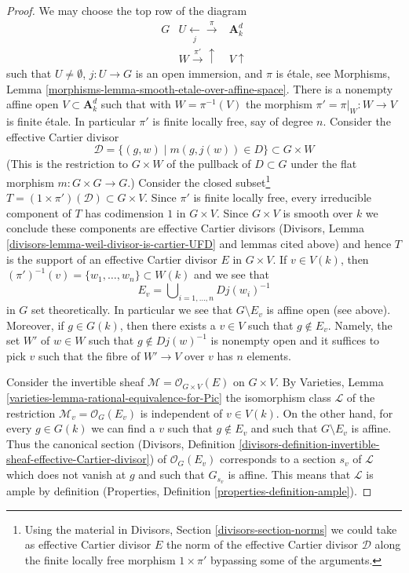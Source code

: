 \begin{proof}
\medskip\noindent
We may choose the top row of the diagram
$$
\begin{array}{ccc}G & U \underset{j}{\longleftarrow}\overset{\pi}{\longrightarrow} & \mathbf{A}^d_k \\  & W \overset{\pi'}{\longrightarrow}\uparrow & V \uparrow\end{array}
$$
such that $U \not = \emptyset$, $j : U \to G$ is an open immersion, and
$\pi$ is \'etale, see
Morphisms, Lemma \ref{morphisms-lemma-smooth-etale-over-affine-space}.
There is a nonempty affine open $V \subset \mathbf{A}^d_k$ such that
with $W = \pi^{-1}(V)$ the morphism $\pi' = \pi|_W : W \to V$ is finite \'etale.
In particular $\pi'$ is finite locally free, say of degree $n$.
Consider the effective Cartier divisor
$$
\mathcal{D} = \{(g, w) \mid m(g, j(w)) \in D\} \subset G \times W
$$
(This is the restriction to $G \times W$ of the pullback of $D \subset G$
under the flat morphism $m : G \times G \to G$.)
Consider the closed subset\footnote{Using the material
in Divisors, Section \ref{divisors-section-norms}
we could take as effective Cartier
divisor $E$ the norm of the effective Cartier divisor $\mathcal{D}$
along the finite locally free morphism $1 \times \pi'$ bypassing
some of the arguments.}
$T = (1 \times \pi')(\mathcal{D}) \subset G \times V$.
Since $\pi'$ is finite locally free, every irreducible component
of $T$ has codimension $1$ in $G \times V$. Since $G \times V$
is smooth over $k$ we conclude these components are effective Cartier
divisors (Divisors, Lemma \ref{divisors-lemma-weil-divisor-is-cartier-UFD}
and lemmas cited above)
and hence $T$ is the support of an effective Cartier divisor
$E$ in $G \times V$. If $v \in V(k)$, then
$(\pi')^{-1}(v) = \{w_1, \ldots, w_n\} \subset W(k)$ and we see that
$$
E_v = \bigcup\nolimits_{i = 1, \ldots, n} D j(w_i)^{-1}
$$
in $G$ set theoretically. In particular we see that $G \setminus E_v$
is affine open (see above).
Moreover, if $g \in G(k)$, then there exists a $v \in V$
such that $g \not \in E_v$. Namely, the set $W'$ of $w \in W$ such that
$g \not \in Dj(w)^{-1}$ is nonempty open and it suffices to pick $v$
such that the fibre of $W' \to V$ over $v$ has $n$ elements.

\medskip\noindent
Consider the invertible sheaf
$\mathcal{M} = \mathcal{O}_{G \times V}(E)$ on $G \times V$.
By Varieties, Lemma \ref{varieties-lemma-rational-equivalence-for-Pic}
the isomorphism class $\mathcal{L}$ of the restriction
$\mathcal{M}_v = \mathcal{O}_G(E_v)$ is independent of $v \in V(k)$.
On the other hand, for every $g \in G(k)$ we can find a $v$
such that $g \not \in E_v$ and such that $G \setminus E_v$
is affine. Thus the canonical section
(Divisors, Definition
\ref{divisors-definition-invertible-sheaf-effective-Cartier-divisor})
of $\mathcal{O}_G(E_v)$
corresponds to a section $s_v$ of $\mathcal{L}$ which does not
vanish at $g$ and such that $G_{s_v}$ is affine.
This means that $\mathcal{L}$ is ample by definition
(Properties, Definition \ref{properties-definition-ample}).
\end{proof}

